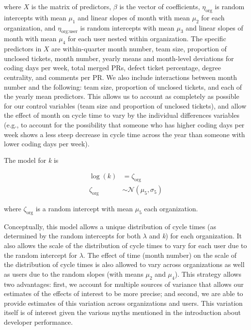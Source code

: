 \documentclass[
]{article}
\begin{document}
where \(X\) is the matrix of predictors, \(\beta\) is the vector of
coefficients, \(\eta_{\text{org}}\) is random intercepts with mean
\(\mu_1\) and linear slopes of month with mean \(\mu_2\) for each
organization, and \(\eta_{\text{org:user}}\) is random intercepts with
mean \(\mu_3\) and linear slopes of month with mean \(\mu_4\) for each
user nested within organization. The specific predictors in \(X\) are
within-quarter month number, team size, proportion of unclosed tickets,
month number, yearly means and month-level deviations for coding days
per week, total merged PRs, defect ticket percentage, degree centrality,
and comments per PR. We also include interactions between month number
and the following: team size, proportion of unclosed tickets, and each
of the yearly mean predictors. This allows us to account as completely
as possible for our control variables (team size and proportion of
unclosed tickets), and allow the effect of month on cycle time to vary
by the individual differences variables (e.g., to account for the
possibility that someone who has higher coding days per week shows a
less steep decrease in cycle time across the year than someone with
lower coding days per week).

The model for \emph{k} is

\begin{equation}
\begin{aligned}
\log(k) &= \zeta_{\text{org}} \\
\zeta_{\text{org}} &\sim \mathcal{N}(\mu_5, \sigma_{5}) 
\end{aligned}
\end{equation}

where \(\zeta_{\text{org}}\) is a random intercept with mean \(\mu_5\)
each organization.

Conceptually, this model allows a unique distribution of cycle times (as
determined by the random intercepts for both \(\lambda\) and \emph{k})
for each organization. It also allows the scale of the distribution of
cycle times to vary for each user due to the random intercept for
\(\lambda\). The effect of time (month number) on the scale of the
distribution of cycle times is also allowed to vary across organizations
as well as users due to the random slopes (with means \(\mu_2\) and
\(\mu_4\)). This strategy allows two advantages: first, we account for
multiple sources of variance that allows our estimates of the effects of
interest to be more precise; and second, we are able to provide
estimates of this variation across organizations and users. This
variation itself is of interest given the various myths mentioned in the
introduction about developer performance.
\end{document}
